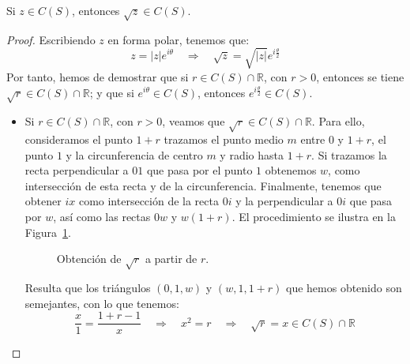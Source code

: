 \begin{lema}
    Si $z\in C(S)$, entonces $\sqrt{z}\in C(S)$.
    \begin{proof}
        Escribiendo $z$ en forma polar, tenemos que:
        \begin{equation*}
            z = |z|e^{i\theta} \quad \Longrightarrow \quad \sqrt{z} = \sqrt{|z|}e^{i\frac{\theta}{2}}
        \end{equation*}
        Por tanto, hemos de demostrar que si $r\in C(S)\cap \mathbb{R}$, con $r>0$, entonces se tiene $\sqrt{r}\in C(S)\cap \mathbb{R}$; y que si $e^{i\theta}\in C(S)$, entonces $e^{i\frac{\theta}{2}}\in C(S)$. 
        \begin{itemize}
            \item Si $r\in C(S)\cap \mathbb{R}$, con $r>0$, veamos que $\sqrt{r}\in C(S)\cap \mathbb{R}$. Para ello, consideramos el punto $1+r$ trazamos el punto medio $m$ entre $0$ y $1+r$, el punto $1$ y la circunferencia de centro $m$ y radio hasta $1+r$. Si trazamos la recta perpendicular a $01$ que pasa por el punto $1$ obtenemos $w$, como intersección de esta recta y de la circunferencia. Finalmente, tenemos que obtener $ix$ como intersección de la recta $0i$ y la perpendicular a $0i$ que pasa por $w$, así como las rectas $0w$ y $w(1+r)$. El procedimiento se ilustra en la Figura~\ref{fig:raiz_cuadrada}.
            \begin{figure}[h]
                \centering
                \caption{Obtención de $\sqrt{r}$ a partir de $r$.}
                \label{fig:raiz_cuadrada}
            \end{figure}
            Resulta que los triángulos $(0, 1, w)$ y $(w, 1, 1+r)$ que hemos obtenido son semejantes, con lo que tenemos:
            \begin{equation*}
                \dfrac{x}{1} = \dfrac{1+r-1}{x}\quad  \Longrightarrow \quad  x^2 = r \quad  \Longrightarrow\quad   \sqrt{r} = x \in C(S)\cap \mathbb{R}
            \end{equation*}


\end{itemize}
\end{proof}
\end{lema}
